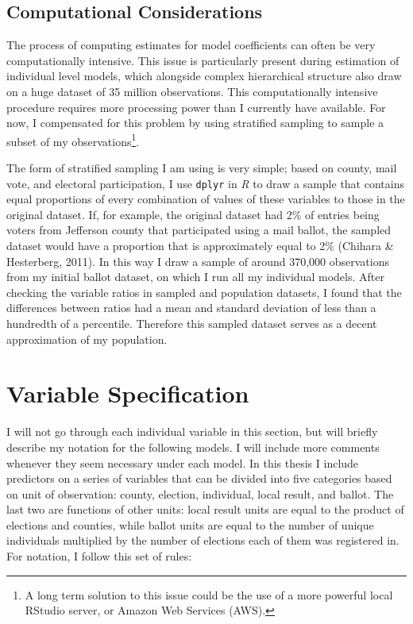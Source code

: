 \documentclass[12pt,twoside]{reedthesis}
\begin{document}
  \subsection{Computational
  Considerations}\label{computational-considerations}
  
  The process of computing estimates for model coefficients can often be
  very computationally intensive. This issue is particularly present
  during estimation of individual level models, which alongside complex
  hierarchical structure also draw on a huge dataset of 35 million
  observations. This computationally intensive procedure requires more
  processing power than I currently have available. For now, I compensated
  for this problem by using stratified sampling to sample a subset of my
  observations\footnote{A long term solution to this issue could be the
    use of a more powerful local RStudio server, or Amazon Web Services
    (AWS).}.
  
  The form of stratified sampling I am using is very simple; based on
  county, mail vote, and electoral participation, I use \texttt{dplyr} in
  \textit{R} to draw a sample that contains equal proportions of every
  combination of values of these variables to those in the original
  dataset. If, for example, the original dataset had 2\% of entries being
  voters from Jefferson county that participated using a mail ballot, the
  sampled dataset would have a proportion that is approximately equal to
  2\% (Chihara \& Hesterberg, 2011). In this way I draw a sample of around
  370,000 observations from my initial ballot dataset, on which I run all
  my individual models. After checking the variable ratios in sampled and
  population datasets, I found that the differences between ratios had a
  mean and standard deviation of less than a hundredth of a percentile.
  Therefore this sampled dataset serves as a decent approximation of my
  population.
  
  \section{Variable Specification}\label{variable-specification}
  
  I will not go through each individual variable in this section, but will
  briefly describe my notation for the following models. I will include
  more comments whenever they seem necessary under each model. In this
  thesis I include predictors on a series of variables that can be divided
  into five categories based on unit of observation: county, election,
  individual, local result, and ballot. The last two are functions of
  other units: local result units are equal to the product of elections
  and counties, while ballot units are equal to the number of unique
  individuals multiplied by the number of elections each of them was
  registered in. For notation, I follow this set of rules:
  
\end{document}
